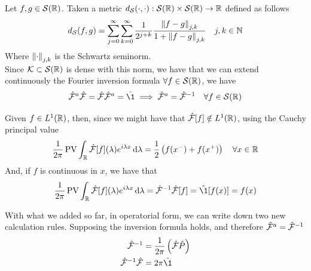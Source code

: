 \documentclass[../complete.tex]{subfiles}
\begin{document}
\begin{thm}
	Let $f,g\in\mathcal{S}(\mathbb{R})$. Taken a metric $d_{\mathcal{S}}(\cdot,\cdot):\mathcal{S}(\mathbb{R})\times\mathcal{S}(\mathbb{R})\to\mathbb{R}$ defined as follows
	\begin{equation*}
		d_{\mathcal{S}}(f,g)=\sum_{j=0}^{\infty}\sum_{k=0}^{\infty}\frac{1}{2^{j+k}}\frac{\norm{f-g}_{j,k}}{1+\norm{f-g}_{j,k}}\quad j,k\in\mathbb{N}
	\end{equation*}
	Where $\norm{\cdot}_{j,k}$ is the Schwartz seminorm.\\
	Since $\mathcal{K}\subset\mathcal{S}(\mathbb{R})$ is dense with this norm, we have that we can extend continuously the Fourier inversion formula $\forall f\in\mathcal{S}(\mathbb{R})$, we have
	\begin{equation*}
		\fou^a\fou=\fou\fou^a=\hat{\1}\implies{}\fou^a=\fou^{-1}\quad\forall f\in\Sp(\R)
	\end{equation*}
\end{thm}
\begin{thm}
	Given $f\in L^1(\mathbb{R})$, then, since we might have that $\hat{\mathcal{F}}[f]\notin L^1(\mathbb{R})$, using the Cauchy principal value
	\begin{equation}
		\frac{1}{2\pi}\operatorname{\mathrm{PV}}\int_{\mathbb{R}}^{}\hat{\mathcal{F}}[f](\lambda)e^{i\lambda x}\operatorname{d\!}\lambda=\frac{1}{2}\left( f(x^-)+f(x^+) \right)\quad\forall x\in\mathbb{R}
		\label{eq:antitrasf}
	\end{equation}
	And, if $f$ is continuous in $x$, we have that
	\begin{equation*}
		\frac{1}{2\pi}\cpv\int_{\R}^{}\fou[f](\lambda)e^{i\lambda x}\diff\lambda=\fou^{-1}\fou[f]=\hat{\1}[f(x)]=f(x)
	\end{equation*}
\end{thm}
\begin{thm}
	With what we added so far, in operatorial form, we can write down two new calculation rules. Supposing the inversion formula holds, and therefore $\hat{\mathcal{F}}^a=\hat{\mathcal{F}}^{-1}$
	\begin{equation}
		\begin{aligned}
			\fou^{-1}&=\frac{1}{2\pi}\left( \fou\opr{P} \right)\\
			\fou^{-1}\fou&=2\pi\opr{\1}
		\end{aligned}
		\label{eq:invtransrules}
	\end{equation}
\end{thm}
\end{document}
